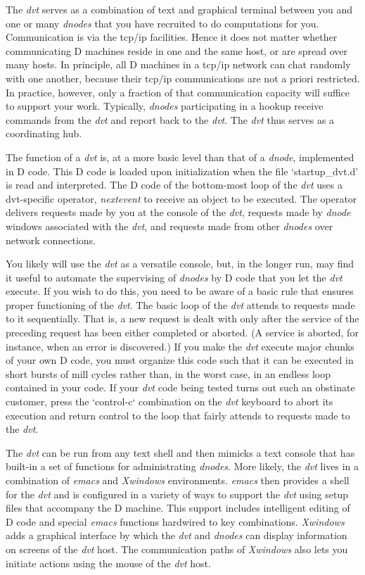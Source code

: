 The \emph{dvt} serves as a combination of text and graphical terminal between you and one or many \emph{dnodes} that you have recruited to do computations for you. Communication is via the tcp/ip facilities. Hence it does not matter whether communicating D machines reside in one and the same host, or are spread over many hosts. In principle, all D machines in a tcp/ip network can chat randomly with one another, because their tcp/ip communications are not a priori restricted. In practice, however, only a fraction of that communication capacity will suffice to support your work. Typically, \emph{dnodes} participating in a hookup receive commands from the \emph{dvt} and report back to the \emph{dvt}. The \emph{dvt} thus serves as a coordinating hub.

The function of a \emph{dvt} is, at a more basic level than that of a \emph{dnode}, implemented in D code. This D code is loaded upon initialization when the file `startup\_dvt.d' is read and interpreted. The D code of the bottom-most loop of the \emph{dvt} uses a dvt-specific operator, \emph{nextevent} to receive an object to be executed. The operator delivers requests made by you at the console  of the \emph{dvt}, requests made by \emph{dnode} windows associated with the \emph{dvt}, and requests made from other \emph{dnodes} over network connections.

You likely will use the \emph{dvt} as a versatile console, but, in the longer run, may find it useful to automate the supervising of \emph{dnodes} by D code that you let the \emph{dvt} execute. If you wish to do this, you need to be aware of a basic rule that ensures proper functioning of the \emph{dvt}. The basic loop of the \emph{dvt} attends to requests made to it sequentially. That is, a new request is dealt with only after the service of the preceding request has been either completed or aborted. (A service is aborted, for instance, when an error is discovered.) If you make the \emph{dvt} execute major chunks of your own D code, you must organize this code such that it can be executed in short bursts of mill cycles rather than, in the worst case, in an endless loop contained in your code. If your \emph{dvt} code being tested turns out such an obstinate customer, press the `control-c` combination on the \emph{dvt} keyboard to abort its execution and return control to the loop that fairly attends to requests made to the \emph{dvt}.

The \emph{dvt} can be run from any text shell and then mimicks a text console that has built-in a set of functions for administrating \emph{dnodes}. More likely, the \emph{dvt} lives in a combination of \emph{emacs} and \emph{Xwindows} environments. \emph{emacs} then provides a shell for the \emph{dvt} and is configured in a variety of ways to support the \emph{dvt} using setup files that accompany the D machine. This support includes intelligent editing of D code and special \emph{emacs} functions hardwired to key combinations. \emph{Xwindows} adds a graphical interface by which the \emph{dvt} and \emph{dnodes} can display information on screens of the \emph{dvt} host. The communication paths of \emph{Xwindows} also lets you initiate actions using the mouse of the \emph{dvt} host.

